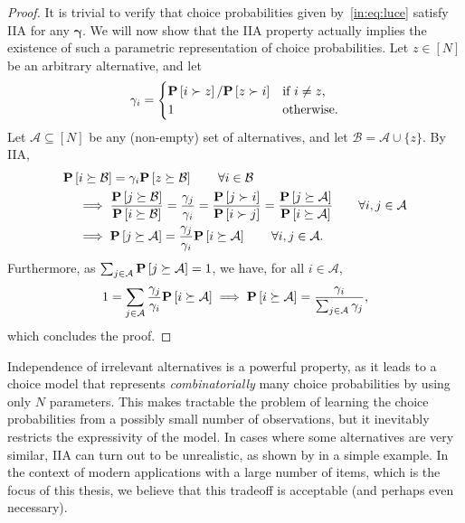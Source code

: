 \begin{proof}
It is trivial to verify that choice probabilities given by~\eqref{in:eq:luce} satisfy IIA for any $\bm{\gamma}$.
We will now show that the IIA property actually implies the existence of such a parametric representation of choice probabilities.
Let $z \in [N]$ be an arbitrary alternative, and let
\begin{align*}
\gamma_i =
\begin{cases}
\mathbf{P}\left[ i \succ z \right] / \mathbf{P}\left[ z \succ i \right] & \text{if $i \ne z$,} \\
1                                   & \text{otherwise.} \\
\end{cases}
\end{align*}
Let $\mathcal{A} \subseteq [N]$ be any (non-empty) set of alternatives, and let $\mathcal{B} = \mathcal{A} \cup \{ z \}$.
By IIA,
\begin{align*}
&\mathbf{P}\left[ i \succeq \mathcal{B} \right] = \gamma_i \mathbf{P}\left[ z \succeq \mathcal{B} \right]
    \qquad \forall i \in \mathcal{B} \\
&\quad \implies
    \frac{\mathbf{P}\left[ j \succeq \mathcal{B} \right]}{\mathbf{P}\left[ i \succeq \mathcal{B} \right]}
    = \frac{\gamma_j}{\gamma_i}
    = \frac{\mathbf{P}\left[ j \succ i \right]}{\mathbf{P}\left[ i \succ j \right]}
    = \frac{\mathbf{P}\left[ j \succeq \mathcal{A} \right]}{\mathbf{P}\left[ i \succeq \mathcal{A} \right]}
    \qquad \forall i, j \in \mathcal{A} \\
&\quad \implies \mathbf{P}\left[ j \succeq \mathcal{A} \right] = \frac{\gamma_j}{\gamma_i} \mathbf{P}\left[ i \succeq \mathcal{A} \right]
    \qquad \forall i, j \in \mathcal{A}.
\end{align*}
Furthermore, as $\sum_{j \in \mathcal{A}} \mathbf{P}\left[ j \succeq \mathcal{A} \right] = 1$, we have, for all $i \in \mathcal{A}$,
\begin{align*}
1 = \sum_{j \in \mathcal{A}} \frac{\gamma_j}{\gamma_i} \mathbf{P}\left[ i \succeq \mathcal{A} \right]
    \implies \mathbf{P}\left[ i \succeq \mathcal{A} \right] = \frac{\gamma_i}{\sum_{j \in \mathcal{A}} \gamma_j},
\end{align*}
which concludes the proof.
\end{proof}

Independence of irrelevant alternatives is a powerful property, as it leads to a choice model that represents \emph{combinatorially} many choice probabilities by using only $N$ parameters.
This makes tractable the problem of learning the choice probabilities from a possibly small number of observations, but it inevitably restricts the expressivity of the model.
In cases where some alternatives are very similar, IIA can turn out to be unrealistic, as shown by \citet{debreu1960review} in a simple example.
In the context of modern applications with a large number of items, which is the focus of this thesis, we believe that this tradeoff is acceptable (and perhaps even necessary).


